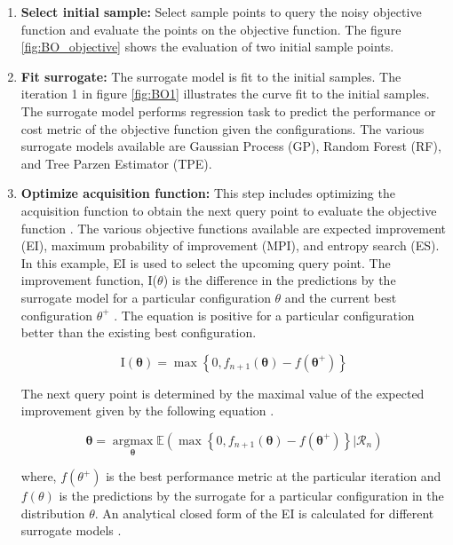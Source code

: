\begin{enumerate}

\item \textbf{Select initial sample:} Select sample points to query the noisy objective function and evaluate the points on the objective function. The figure \ref{fig:BO_objective} shows the evaluation of two initial sample points.

\item \textbf{Fit surrogate:} The surrogate model is fit to the initial samples. The iteration 1 in figure \ref{fig:BO1} illustrates the curve fit to the initial samples. The surrogate model performs regression task to predict the performance or cost metric of the objective function given the configurations. The various surrogate models available are Gaussian Process (GP), Random Forest (RF), and Tree Parzen Estimator (TPE).

\item \textbf{Optimize acquisition function:} This step includes optimizing the acquisition function to obtain the next query point to evaluate the objective function \cite{BayesianOptimization_papertutorials}. The various objective functions available are expected improvement (EI), maximum probability of improvement (MPI), and entropy search (ES). In this example, EI is used to select the upcoming query point. The improvement function, I($\theta$) is the difference in the predictions by the surrogate model for a particular configuration $\theta$ and the current best configuration $\theta^+$ \cite{EI_proper}. The equation is positive for a particular configuration better than the existing best configuration.

\begin{equation}
\mathrm{I}(\mathbf{\theta})=\max \left\{0, f_{n+1}(\mathbf{\theta})-f\left(\mathbf{\theta}^{+}\right)\right\}
\end{equation}

The next query point is determined by the maximal value of the expected improvement given by the following equation \cite{EI_analytical}.

\begin{equation}
\mathbf{\theta}=\underset{\mathbf{\theta}}{\operatorname{argmax}} \mathbb{E}\left(\max \left\{0, f_{n+1}(\mathbf{\theta})-f\left(\mathbf{\theta}^{+}\right)\right\} | \mathcal{R}_{n}\right)
\end{equation}

where, $f(\theta^+)$ is the best performance metric at the particular iteration and $f(\theta)$ is the predictions by the surrogate for a particular configuration in the distribution $\theta$. An analytical closed form of the EI is calculated for different surrogate models \cite{EI_analytical} \cite{EI_proper}.


\end{enumerate}
